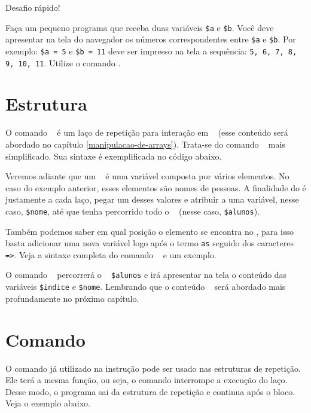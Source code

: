 {\Large Desafio rápido!}

Faça um pequeno programa que receba duas variáveis \texttt{\$a} e \texttt{\$b}. Você deve
apresentar na tela do navegador os números correspondentes entre \texttt{\$a} e 
\texttt{\$b}. Por exemplo: \texttt{\$a = 5} e \texttt{\$b = 11} deve ser impresso na tela
a sequência: \texttt{5, 6, 7, 8, 9, 10, 11}. Utilize o comando \comandofor.

\section{Estrutura \comandoforeach}
\label{estrutura-foreach}

O comando \comandoforeach~ é um laço de repetição para interação em 
\tipoarray~ (esse conteúdo será abordado no capítulo \ref{manipulacao-de-arrays}).
Trata-se do comando \comandofor~ mais simplificado. Sua sintaxe é exemplificada no código abaixo.



Veremos adiante que um \tipoarray~ é uma variável composta por vários elementos. No caso do 
exemplo anterior, esses elementos são nomes de pessoas. A finalidade do \comandoforeach 
é justamente a cada laço, pegar um desses valores e atribuir a uma variável, nesse caso, 
\texttt{\$nome}, até que tenha percorrido todo o \tipoarray~ (nesse caso, \texttt{\$alunos}).

Também podemos saber em qual posição o elemento se encontra no \tipoarray, para isso basta 
adicionar uma nova variável logo após o termo \texttt{as} seguido dos caracteres \texttt{=>}.
Veja a sintaxe completa do comando \comandoforeach~ e um exemplo.



O comando \comandoforeach~ percorrerá o \tipoarray~ \texttt{\$alunos} e irá apresentar
na tela o conteúdo das variáveis \texttt{\$indice} e \texttt{\$nome}. Lembrando que o
conteúdo \tipoarray~ será abordado mais profundamente no próximo capítulo.

\section{Comando \comandobreak}
\label{comando-break}

O comando \comandobreak já utilizado na instrução \comandoswitch pode ser usado nas 
estruturas de repetição. Ele terá a mesma função, ou seja, o comando interrompe a 
execução do laço. Desse modo, o programa sai da estrutura de repetição e continua 
após o bloco. Veja o exemplo abaixo.

